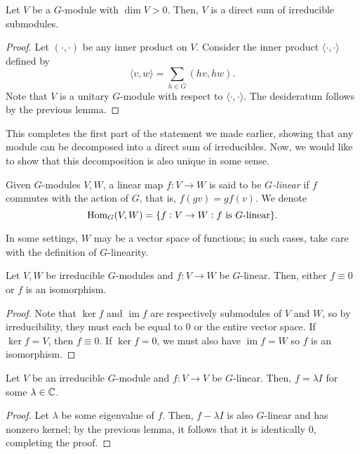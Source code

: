 	\begin{flem}
		Let $V$ be a $G$-module with $\dim V > 0$. Then, $V$ is a direct sum of irreducible submodules.
	\end{flem}
	\begin{proof}
		Let $(\cdot,\cdot)$ be any inner product on $V$. Consider the inner product $\langle \cdot,\cdot\rangle$ defined by
		\[ \langle v,w\rangle = \sum_{h \in G} ( hv,hw ). \]
		Note that $V$ is a unitary $G$-module with respect to $\langle \cdot,\cdot\rangle$. The desideratum follows by the previous lemma.
	\end{proof}

	This completes the first part of the statement we made earlier, showing that any module can be decomposed into a direct sum of irreducibles. Now, we would like to show that this decomposition is also unique in some sense.

	\begin{fdef}
		Given $G$-modules $V,W$, a linear map $f : V \to W$ is said to be \emph{$G$-linear} if $f$ commutes with the action of $G$, that is, $f(gv) = gf(v)$. We denote
		\[ \operatorname{Hom}_G(V,W) = \{ f : V \to W : f \text{ is $G$-linear} \}. \]
	\end{fdef}

	In some settings, $W$ may be a vector space of functions; in such cases, take care with the definition of $G$-linearity.

	\begin{flem}
		Let $V,W$ be irreducible $G$-modules and $f : V \to W$ be $G$-linear. Then, either $f \equiv 0$ or $f$ is an isomorphism.
	\end{flem}
	\begin{proof}
		Note that $\ker f$ and $\operatorname{im} f$ are respectively submodules of $V$ and $W$, so by irreducibility, they must each be equal to $0$ or the entire vector space. If $\ker f = V$, then $f \equiv 0$. If $\ker f = 0$, we must also have $\operatorname{im} f = W$ so $f$ is an isomorphism.
	\end{proof}

	\begin{flem}
		Let $V$ be an irreducible $G$-module and $f : V \to V$ be $G$-linear. Then, $f = \lambda I$ for some $\lambda \in \mathbb{C}$.
	\end{flem}
	\begin{proof}
		Let $\lambda$ be some eigenvalue of $f$. Then, $f - \lambda I$ is also $G$-linear and has nonzero kernel; by the previous lemma, it follows that it is identically $0$, completing the proof.
	\end{proof}

